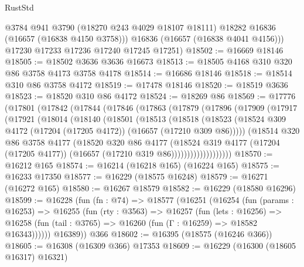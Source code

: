 \begin{lexlean}{RustStd}
\begin{coremodule}
          @3784
          @941
          @3790
          (@18270 @243 @4029 @18107 @18111)
          @18282
          @16836
          (@16657 (@16838 @4150 @3758)))
        @16836
        (@16657 (@16838 @4041 @4156)))
      @17230
      @17233
      @17236
      @17240
      @17245
      @17251)
@18502 := @16669 @18146
@18505 := @18502 @3636 @3636 @16673
@18513 := @18505 @4168 @310 @320 @86 @3758 @4173 @3758 @4178
@18514 := @16686 @18146
@18518 := @18514 @310 @86 @3758 @4172
@18519 := @17478 @18146
@18520 := @18519 @3636
@18523 := @18520 @310 @86 @4172
@18524 := @18269 @86
@18569 := @17776
    (@17801
      (@17842
        (@17844
          (@17846
            (@17863
              (@17879
                (@17896
                  (@17909
                    (@17917
                      (@17921
                        (@18014
                          (@18140
                            (@18501
                              (@18513
                                (@18518
                                  (@18523
                                    (@18524
                                      @309
                                      @4172
                                      (@17204 (@17205 @4172))
                                      (@16657 (@17210 @309 @86)))))
                                (@18514
                                  @320
                                  @86
                                  @3758
                                  @4177
                                  (@18520
                                    @320
                                    @86
                                    @4177
                                    (@18524
                                      @319
                                      @4177
                                      (@17204 (@17205 @4177))
                                      (@16657 (@17210 @319 @86)))))))))))))))))))
@18570 := @16212 @165
@18574 := @16214 (@16218 @165) (@16224 @165)
@18575 := @16233 @17350
@18577 := @16229 (@18575 @16248)
@18579 := @16271 (@16272 @165)
@18580 := @16267 @18579
@18582 := @16229 (@18580 @16296)
@18599 := @16228
    (fun (fn : @74) =>
    @18577
      (@16251
        (@16254
          (fun (params : @16253) =>
          @16255
            (fun (rty : @3563) =>
            @16257
              (fun (lets : @16256) =>
              @16258 (fun (tail : @3765) => @16260 (fun (Γ : @16259) => @18582 @16343))))))
        @16389))
    @366
@18602 := @16395 (@18575 (@16246 @366))
@18605 := @16308 (@16309 @366) @17353
@18609 := @16229 (@16300 (@18605 @16317) @16321)

\end{coremodule}
\end{lexlean}
